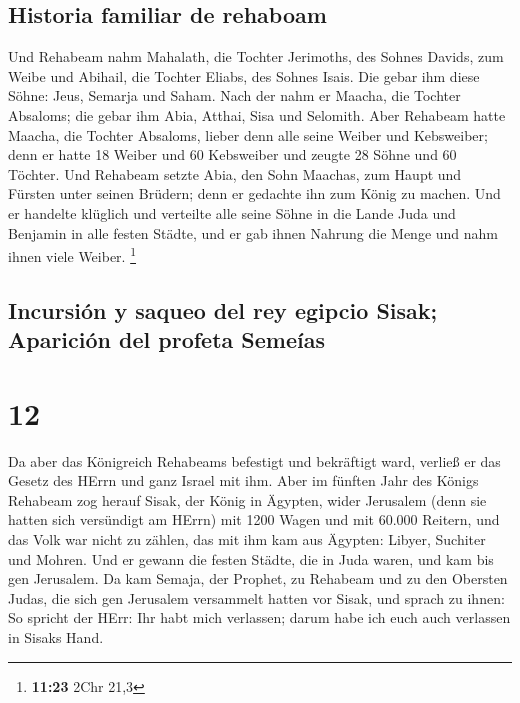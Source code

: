 \hypertarget{historia-familiar-de-rehaboam}{%
\subsection{Historia familiar de
rehaboam}\label{historia-familiar-de-rehaboam}}

 Und Rehabeam nahm Mahalath, die Tochter Jerimoths, des
Sohnes Davids, zum Weibe und Abihail, die Tochter Eliabs, des Sohnes
Isais.  Die gebar ihm diese Söhne: Jeus, Semarja und
Saham.  Nach der nahm er Maacha, die Tochter Absaloms;
die gebar ihm Abia, Atthai, Sisa und Selomith.  Aber
Rehabeam hatte Maacha, die Tochter Absaloms, lieber denn alle seine
Weiber und Kebsweiber; denn er hatte 18 Weiber und 60 Kebsweiber und
zeugte 28 Söhne und 60 Töchter.  Und Rehabeam setzte
Abia, den Sohn Maachas, zum Haupt und Fürsten unter seinen Brüdern; denn
er gedachte ihn zum König zu machen.  Und er handelte
klüglich und verteilte alle seine Söhne in die Lande Juda und Benjamin
in alle festen Städte, und er gab ihnen Nahrung die Menge und nahm ihnen
viele Weiber. \footnote{\textbf{11:23} 2Chr 21,3}

\hypertarget{incursiuxf3n-y-saqueo-del-rey-egipcio-sisak-apariciuxf3n-del-profeta-semeuxedas}{%
\subsection{Incursión y saqueo del rey egipcio Sisak; Aparición del
profeta
Semeías}\label{incursiuxf3n-y-saqueo-del-rey-egipcio-sisak-apariciuxf3n-del-profeta-semeuxedas}}

\hypertarget{section-11}{%
\section{12}\label{section-11}}

 Da aber das Königreich Rehabeams befestigt und bekräftigt
ward, verließ er das Gesetz des HErrn und ganz Israel mit ihm.
 Aber im fünften Jahr des Königs Rehabeam zog herauf
Sisak, der König in Ägypten, wider Jerusalem (denn sie hatten sich
versündigt am HErrn)  mit 1200 Wagen und mit 60.000
Reitern, und das Volk war nicht zu zählen, das mit ihm kam aus Ägypten:
Libyer, Suchiter und Mohren.  Und er gewann die festen
Städte, die in Juda waren, und kam bis gen Jerusalem.  Da
kam Semaja, der Prophet, zu Rehabeam und zu den Obersten Judas, die sich
gen Jerusalem versammelt hatten vor Sisak, und sprach zu ihnen: So
spricht der HErr: Ihr habt mich verlassen; darum habe ich euch auch
verlassen in Sisaks Hand.

